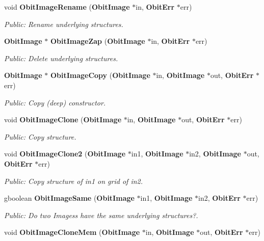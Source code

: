 \begin{CompactItemize}
void {\bf Obit\-Image\-Rename} ({\bf Obit\-Image} $\ast$in, {\bf Obit\-Err} $\ast$err)
\begin{CompactList}\small\item\em Public: Rename underlying structures. \item\end{CompactList}\item 
{\bf Obit\-Image} $\ast$ {\bf Obit\-Image\-Zap} ({\bf Obit\-Image} $\ast$in, {\bf Obit\-Err} $\ast$err)
\begin{CompactList}\small\item\em Public: Delete underlying structures. \item\end{CompactList}\item 
{\bf Obit\-Image} $\ast$ {\bf Obit\-Image\-Copy} ({\bf Obit\-Image} $\ast$in, {\bf Obit\-Image} $\ast$out, {\bf Obit\-Err} $\ast$err)
\begin{CompactList}\small\item\em Public: Copy (deep) constructor. \item\end{CompactList}\item 
void {\bf Obit\-Image\-Clone} ({\bf Obit\-Image} $\ast$in, {\bf Obit\-Image} $\ast$out, {\bf Obit\-Err} $\ast$err)
\begin{CompactList}\small\item\em Public: Copy structure. \item\end{CompactList}\item 
void {\bf Obit\-Image\-Clone2} ({\bf Obit\-Image} $\ast$in1, {\bf Obit\-Image} $\ast$in2, {\bf Obit\-Image} $\ast$out, {\bf Obit\-Err} $\ast$err)
\begin{CompactList}\small\item\em Public: Copy structure of in1 on grid of in2. \item\end{CompactList}\item 
gboolean {\bf Obit\-Image\-Same} ({\bf Obit\-Image} $\ast$in1, {\bf Obit\-Image} $\ast$in2, {\bf Obit\-Err} $\ast$err)
\begin{CompactList}\small\item\em Public: Do two Imagess have the same underlying structures?. \item\end{CompactList}\item 
void {\bf Obit\-Image\-Clone\-Mem} ({\bf Obit\-Image} $\ast$in, {\bf Obit\-Image} $\ast$out, {\bf Obit\-Err} $\ast$err)

\end{CompactItemize}
